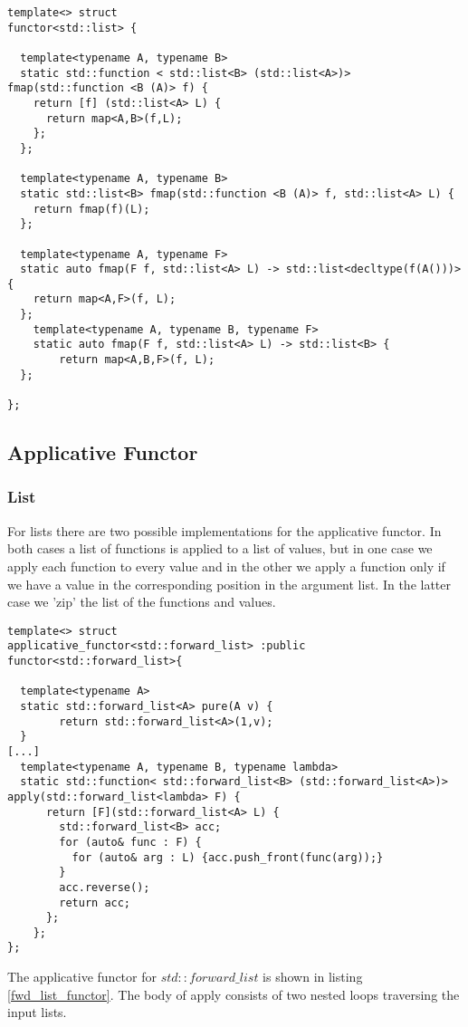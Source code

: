 \documentclass[12pt,fleqn]{article}
\begin{document}
\begin{minipage}{\linewidth}
\begin{lstlisting}[caption=functor for std::list, label=functorlist]
template<> struct 
functor<std::list> {

  template<typename A, typename B>
  static std::function < std::list<B> (std::list<A>)> fmap(std::function <B (A)> f) {
    return [f] (std::list<A> L) {
      return map<A,B>(f,L);
    };
  };

  template<typename A, typename B>
  static std::list<B> fmap(std::function <B (A)> f, std::list<A> L) {
    return fmap(f)(L);
  };

  template<typename A, typename F>
  static auto fmap(F f, std::list<A> L) -> std::list<decltype(f(A()))> {
    return map<A,F>(f, L);
  };
	template<typename A, typename B, typename F>
	static auto fmap(F f, std::list<A> L) -> std::list<B> {
		return map<A,B,F>(f, L);
  };

};
\end{lstlisting}
\end{minipage}
  
%
%
\subsection{Applicative Functor}
%
%

\subsubsection{List}
%
For lists there are two possible implementations for the applicative functor.
In both cases a list of functions is applied to a list of values, but in one case we apply each function to every value and in the other we apply a function 
only if we have a value in the corresponding position in the argument list. 
In the latter case we 'zip' the list of the functions and values.

%
%
\begin{minipage}{\linewidth}
\begin{lstlisting}[caption=std::forward\_list is an applicative functor, label=fwd_list_functor]
template<> struct 
applicative_functor<std::forward_list> :public functor<std::forward_list>{

  template<typename A>
  static std::forward_list<A> pure(A v) {
		return std::forward_list<A>(1,v);
  }
[...]
  template<typename A, typename B, typename lambda>
  static std::function< std::forward_list<B> (std::forward_list<A>)> apply(std::forward_list<lambda> F) {
      return [F](std::forward_list<A> L) {
	    std::forward_list<B> acc;
	    for (auto& func : F) {
	      for (auto& arg : L) {acc.push_front(func(arg));}
        } 
	    acc.reverse();
	    return acc;
      };
    };
};
\end{lstlisting}
\end{minipage}
%
%
%
The applicative functor for $std::forward\_list$ is shown in listing \ref{fwd_list_functor}.
The body of apply consists of two nested loops traversing the input lists. 
%
\end{document}
